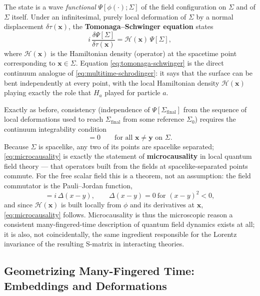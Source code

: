 \documentclass[11pt]{book}
\newcommand{\fdv}[2]{\dfrac{\delta #1}{\delta #2}}
\newcommand{\Ham}{\mathcal{H}}
\theoremstyle{definition}
\theoremstyle{remark}
\begin{document}
The state is a wave \emph{functional} $\Psi[\phi(\cdot);\Sigma]$ of the field configuration on $\Sigma$ and of $\Sigma$ itself. Under an infinitesimal, purely local deformation of $\Sigma$ by a normal displacement $\delta\tau(\mathbf{x})$, the \textbf{Tomonaga--Schwinger equation} states
\begin{equation}
i\,\fdv{\Psi[\Sigma]}{\tau(\mathbf{x})} = \Ham(\mathbf{x})\,\Psi[\Sigma],
\label{eq:tomonaga-schwinger}
\end{equation}
where $\Ham(\mathbf{x})$ is the Hamiltonian density (operator) at the spacetime point corresponding to $\mathbf{x}\in\Sigma$. Equation \eqref{eq:tomonaga-schwinger} is the direct continuum analogue of \eqref{eq:multitime-schrodinger}: it says that the surface can be bent independently at every point, with the local Hamiltonian density $\Ham(\mathbf{x})$ playing exactly the role that $H_a$ played for particle $a$.

Exactly as before, consistency (independence of $\Psi[\Sigma_{\mathrm{final}}]$ from the sequence of local deformations used to reach $\Sigma_{\mathrm{final}}$ from some reference $\Sigma_0$) requires the continuum integrability condition
\begin{equation}
[\Ham(\mathbf{x}),\Ham(\mathbf{y})] = 0 \qquad \text{for all } \mathbf{x}\neq\mathbf{y}\text{ on }\Sigma.
\label{eq:microcausality}
\end{equation}
Because $\Sigma$ is spacelike, any two of its points are spacelike separated; \eqref{eq:microcausality} is exactly the statement of \textbf{microcausality} in local quantum field theory --- that operators built from the fields at spacelike-separated points commute. For the free scalar field this is a theorem, not an assumption: the field commutator is the Pauli--Jordan function,
\begin{equation}
[\phi(x),\phi(y)] = i\,\Delta(x-y), \qquad \Delta(x-y)=0 \ \text{for } (x-y)^2<0,
\end{equation}
and since $\Ham(\mathbf{x})$ is built locally from $\phi$ and its derivatives at $\mathbf{x}$, \eqref{eq:microcausality} follows. Microcausality is thus the microscopic reason a consistent many-fingered-time description of quantum field dynamics exists at all; it is also, not coincidentally, the same ingredient responsible for the Lorentz invariance of the resulting S-matrix in interacting theories.

\subsection{Geometrizing Many-Fingered Time: Embeddings and Deformations}
\label{sec:embeddings}
\end{document}
